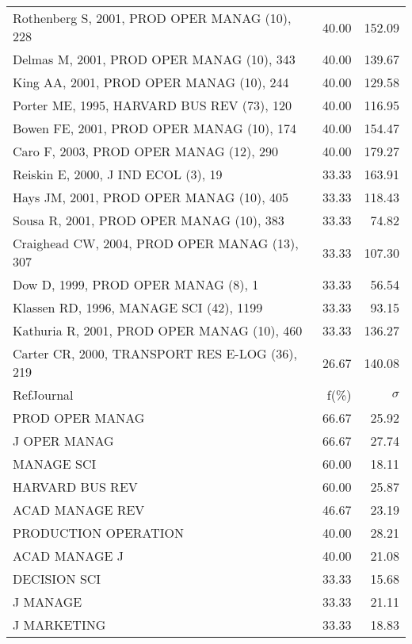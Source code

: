 \documentclass[a4paper,11pt]{report}
\begin{document}
\begin{landscape}
\begin{table}[!ht]
{\begin{tabular}{|l r r|}
Rothenberg S, 2001, PROD OPER MANAG (10), 228 & 40.00 & 152.09\\
Delmas M, 2001, PROD OPER MANAG (10), 343 & 40.00 & 139.67\\
King AA, 2001, PROD OPER MANAG (10), 244 & 40.00 & 129.58\\
Porter ME, 1995, HARVARD BUS REV (73), 120 & 40.00 & 116.95\\
Bowen FE, 2001, PROD OPER MANAG (10), 174 & 40.00 & 154.47\\
Caro F, 2003, PROD OPER MANAG (12), 290 & 40.00 & 179.27\\
Reiskin E, 2000, J IND ECOL (3), 19 & 33.33 & 163.91\\
Hays JM, 2001, PROD OPER MANAG (10), 405 & 33.33 & 118.43\\
Sousa R, 2001, PROD OPER MANAG (10), 383 & 33.33 & 74.82\\
Craighead CW, 2004, PROD OPER MANAG (13), 307 & 33.33 & 107.30\\
Dow D, 1999, PROD OPER MANAG (8), 1 & 33.33 & 56.54\\
Klassen RD, 1996, MANAGE SCI (42), 1199 & 33.33 & 93.15\\
Kathuria R, 2001, PROD OPER MANAG (10), 460 & 33.33 & 136.27\\
Carter CR, 2000, TRANSPORT RES E-LOG (36), 219 & 26.67 & 140.08\\
\hline
\hline
RefJournal & f(\%) & $\sigma$\\
\hline
PROD OPER MANAG & 66.67 & 25.92\\
J OPER MANAG & 66.67 & 27.74\\
MANAGE SCI & 60.00 & 18.11\\
HARVARD BUS REV & 60.00 & 25.87\\
ACAD MANAGE REV & 46.67 & 23.19\\
PRODUCTION OPERATION & 40.00 & 28.21\\
ACAD MANAGE J & 40.00 & 21.08\\
DECISION SCI & 33.33 & 15.68\\
J MANAGE & 33.33 & 21.11\\
J MARKETING & 33.33 & 18.83\\
\hline
\end{tabular}
}
\end{table}

\clearpage


\end{landscape}
\end{document}
